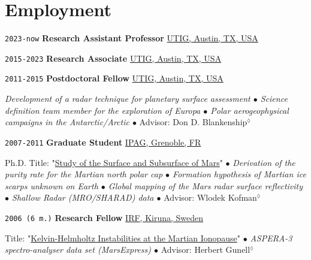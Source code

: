 
\section*{Employment}

\TabPositions{7em,28em}

\noindent \texttt{2023-now} \tab \textbf{Research Assistant Professor} \tab
\href{https://www.ig.utexas.edu/}{UTIG, Austin, TX, USA}
\begin{adjustwidth}{7em}{}
\end{adjustwidth}
\vspace{-.5em}

\noindent \texttt{2015-2023} \tab \textbf{Research Associate} \tab
\href{https://www.ig.utexas.edu/}{UTIG, Austin, TX, USA}
\begin{adjustwidth}{7em}{}
\end{adjustwidth}
\vspace{-.5em}

\noindent \texttt{2011-2015} \tab \textbf{Postdoctoral Fellow} \tab
\href{https://www.ig.utexas.edu/}{UTIG, Austin, TX, USA}
\begin{adjustwidth}{7em}{}
\textit{Development of a radar technique for planetary surface assessment $\bullet$ Science definition team member for the exploration of Europa $\bullet$ Polar aerogeophysical campaigns in the Antarctic/Arctic $\bullet$} Advisor: Don D. Blankenship$^\lozenge$
\end{adjustwidth}
\vspace{.5em}

\noindent \texttt{2007-2011} \tab \textbf{Graduate Student} \tab
\href{http://ipag.osug.fr/}{IPAG, Grenoble, FR}
\vspace{.3em}
\begin{adjustwidth}{7em}{}
Ph.D. Title: "\ul{Study of the Surface and Subsurface of Mars}" 
$\bullet$
\textit{Derivation of the purity rate for the Martian north polar cap $\bullet$ Formation hypothesis of Martian ice scarps unknown on Earth $\bullet$ Global mapping of the Mars radar surface reflectivity $\bullet$ Shallow Radar (MRO/SHARAD) data $\bullet$} Advisor: Wlodek Kofman$^\lozenge$
\end{adjustwidth}
\vspace{.5em}

\noindent \texttt{2006 (6 m.)} \tab \textbf{Research Fellow} \tab
\href{https://www2.irf.se/}{IRF, Kiruna, Sweden}
\vspace{.3em}
\begin{adjustwidth}{7em}{}
Title: "\ul{Kelvin-Helmholtz Instabilities at the Martian Ionopause}"
$\bullet$ 
\textit{ASPERA-3 spectro-analyser data set (MarsExpress) $\bullet$} Advisor: Herbert Gunell$^\lozenge$
\end{adjustwidth}
\vspace{.5em}

